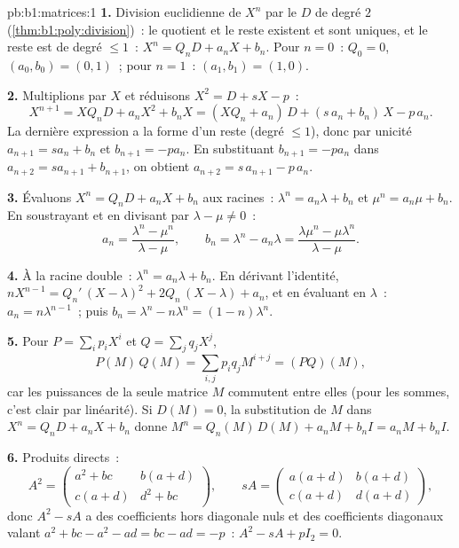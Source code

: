 \begin{solution}{pb:b1:matrices:1}
\textbf{1.} Division euclidienne de $X^n$ par le  $D$
de degré $2$ (\cref{thm:b1:poly:division})~: le quotient et le reste
existent et sont uniques, et le reste est de degré $\leq 1$~: $X^n =
Q_n D + a_n X + b_n$. Pour $n = 0$~: $Q_0 = 0$, $(a_0, b_0) = (0,
1)$~; pour $n = 1$~: $(a_1, b_1) = (1, 0)$.

\textbf{2.} Multiplions par $X$ et réduisons $X^2 = D + sX - p$~:
\[
X^{n+1} = X Q_n D + a_n X^2 + b_n X
= (X Q_n + a_n)\,D + (s\,a_n + b_n)\,X - p\,a_n .
\]
La dernière expression a la forme d'un reste (degré $\leq 1$), donc par
unicité $a_{n+1} = s a_n + b_n$ et $b_{n+1} = -p a_n$.
En substituant $b_{n+1} = -pa_n$ dans $a_{n+2} = s a_{n+1} +
b_{n+1}$, on obtient $a_{n+2} = s\,a_{n+1} - p\,a_n$.

\textbf{3.} Évaluons $X^n = Q_n D + a_n X + b_n$ aux racines~:
$\lambda^n = a_n\lambda + b_n$ et $\mu^n = a_n\mu + b_n$.
En soustrayant et en divisant par $\lambda - \mu \neq 0$~:
\[
a_n = \frac{\lambda^n - \mu^n}{\lambda - \mu},
\qquad
b_n = \lambda^n - a_n\lambda
= \frac{\lambda\mu^n - \mu\lambda^n}{\lambda - \mu} .
\]

\textbf{4.} À la racine double~: $\lambda^n = a_n\lambda + b_n$.
En dérivant l'identité, $nX^{n-1} = Q_n'\,(X - \lambda)^2
+ 2Q_n\,(X - \lambda) + a_n$, et en évaluant en $\lambda$~: $a_n
= n\lambda^{n-1}$~; puis $b_n = \lambda^n - n\lambda^{n} = (1 -
n)\lambda^{n}$.

\textbf{5.} Pour $P = \sum_i p_i X^i$ et $Q = \sum_j q_j X^j$,
\[
P(M)\,Q(M) = \sum_{i,j} p_i q_j M^{i+j} = (PQ)(M),
\]
car les puissances de la seule matrice $M$ commutent entre elles (pour
les sommes, c'est clair par linéarité). Si $D(M) = 0$, la substitution
de $M$ dans $X^n = Q_n D + a_n X + b_n$ donne $M^n = Q_n(M)\,D(M) + a_n
M + b_n I = a_n M + b_n I$.

\textbf{6.} Produits directs~:
\[
A^2 = \begin{pmatrix}
a^2 + bc & b(a + d)\\
c(a + d) & d^2 + bc
\end{pmatrix},
\qquad
s A = \begin{pmatrix}
a(a+d) & b(a+d)\\
c(a+d) & d(a+d)
\end{pmatrix},
\]
donc $A^2 - sA$ a des coefficients hors diagonale nuls et des
coefficients diagonaux valant
$a^2 + bc - a^2 - ad = bc - ad = -p$~: $A^2 - sA + pI_2 = 0$.


\end{solution}
